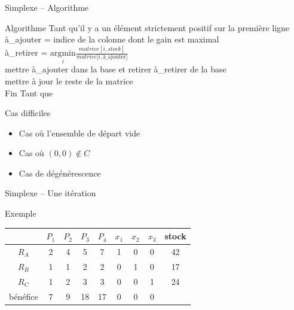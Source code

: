 \documentclass{beamer}
\begin{document}
  \begin{frame}{Simplexe -- Algorithme}
    \begin{block}{Algorithme}
      Tant qu'il y a un élément strictement positif sur la première ligne\\
      \quad à\_ajouter = indice de la colonne dont le gain est maximal \\
      \quad à\_retirer = $\underset{i}{\text{argmin}} \frac{
                      matrice[i, stock]}{matrice[i, \text{à\_ajouter]}}$ \\
      \quad mettre à\_ajouter dans la base et retirer à\_retirer de la base \\
      \quad mettre à jour le reste de la matrice \\
      Fin Tant que
    \end{block}

    \begin{block}{Cas difficiles}
      \begin{itemize}
        \item Cas où l'ensemble de départ vide
        \item Cas où $(0,0) \notin C$
        \item Cas de dégénérescence
      \end{itemize}
    \end{block}
  \end{frame}

  \begin{frame}{Simplexe -- Une itération}
    \begin{exampleblock}{Exemple}
      \begin{center}
        \begin{tabular}{|c|ccccccc|c|}\hline
          & $P_1$ & $P_2$ & $P_3$ & $P_4$ & $x_1$ & $x_2$ & $x_3$ & stock \\ \hline
          $R_A$ & 2 & 4 & 5 & 7 & 1 & 0 & 0 & 42 \\
          $R_B$ & 1 & 1 & 2 & 2 & 0 & 1 & 0 & 17 \\
          $R_C$ & 1 & 2 & 3 & 3 & 0 & 0 & 1 & 24 \\ \hline
          bénéfice & 7 & 9 & \color{red}18\color{black} & 17 & 0 & 0 & 0 & \\ \hline
        \end{tabular}
      \end{center}
    \end{exampleblock}
  \end{frame}
\end{document}
